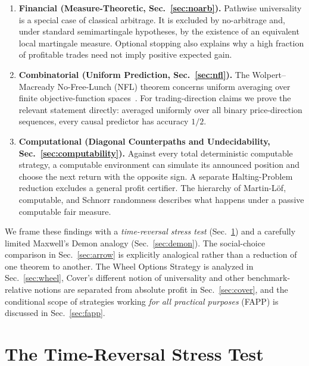 \documentclass[aps,pra,reprint,superscriptaddress,amsmath,amssymb,floatfix]{revtex4-2}
\theoremstyle{plain}
\theoremstyle{definition}
\theoremstyle{remark}
\begin{document}
\begin{enumerate}
  \item \textbf{Financial (Measure-Theoretic, Sec.~\ref{sec:noarb}).}
  Pathwise universality is a special case of classical arbitrage. It is
  excluded by no-arbitrage and, under standard semimartingale hypotheses, by
  the existence of an equivalent local martingale measure. Optional stopping
  also explains why a high fraction of profitable trades need not imply
  positive expected gain.

  \item \textbf{Combinatorial (Uniform Prediction, Sec.~\ref{sec:nfl}).}
  The Wolpert--Macready No-Free-Lunch (NFL) theorem concerns uniform averaging
  over finite objective-function spaces~\cite{Wolpert:1997:NFL:2221336.2221408}.
  For trading-direction claims we prove the relevant statement directly:
  averaged uniformly over all binary price-direction sequences, every causal
  predictor has accuracy \(1/2\).

  \item \textbf{Computational (Diagonal Counterpaths and Undecidability,
  Sec.~\ref{sec:computability}).} Against every total deterministic computable
  strategy, a computable environment can simulate its announced position and
  choose the next return with the opposite sign. A separate Halting-Problem
  reduction excludes a general profit certifier. The hierarchy of
  Martin-L\"of, computable, and Schnorr randomness describes
  what happens under a passive computable fair measure.
\end{enumerate}

We frame these findings with a \emph{time-reversal stress test}
(Sec.~\ref{sec:criterion}) and a carefully limited Maxwell's Demon analogy
(Sec.~\ref{sec:demon}). The social-choice comparison in
Sec.~\ref{sec:arrow} is explicitly analogical rather than a reduction of one
theorem to another. The Wheel Options Strategy is analyzed in
Sec.~\ref{sec:wheel}, Cover's different notion of universality and other
benchmark-relative notions are separated from absolute profit in
Sec.~\ref{sec:cover}, and the conditional scope of strategies working
\emph{for all practical purposes} (FAPP) is discussed in Sec.~\ref{sec:fapp}.

\section{The Time-Reversal Stress Test}
\label{sec:criterion}
\end{document}
